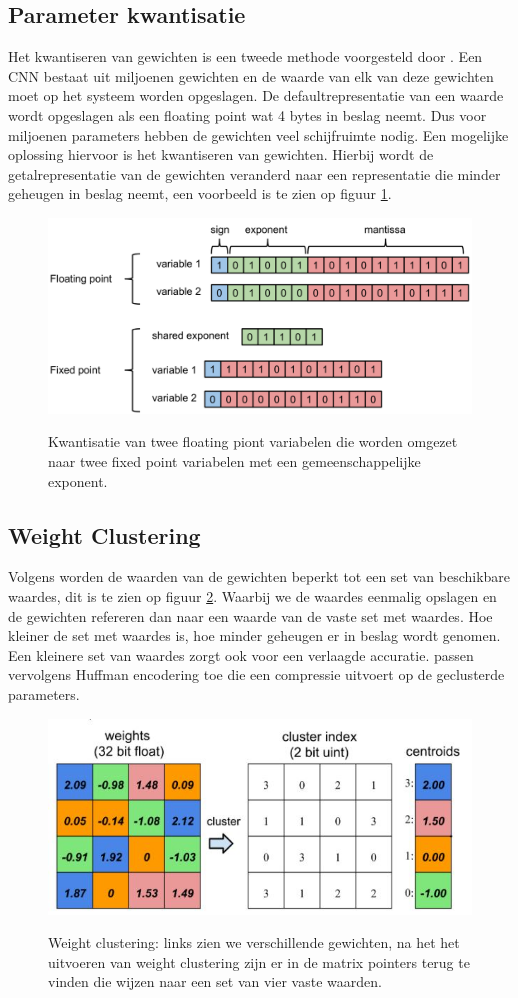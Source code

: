 \subsection{Parameter kwantisatie} \label{quant}
Het kwantiseren van gewichten is een tweede methode voorgesteld door \cite{han_deep_2016}.
Een CNN bestaat uit miljoenen gewichten en de waarde van elk van deze gewichten moet op het systeem worden opgeslagen.
De defaultrepresentatie van een waarde wordt opgeslagen als een floating point wat 4 bytes in beslag neemt.
Dus voor miljoenen parameters hebben de gewichten veel schijfruimte nodig.
Een mogelijke oplossing hiervoor is het kwantiseren van gewichten.
Hierbij wordt de getalrepresentatie van de gewichten veranderd naar een representatie die minder geheugen in beslag neemt, een voorbeeld is te zien op figuur \ref{fig:kwantizatie}.

\begin{figure}[!ht]
	\centering
	\includegraphics[width=0.65\linewidth]{fig/kwantization.png}
	\caption{Kwantisatie van twee floating piont variabelen die worden omgezet naar twee fixed point variabelen met een gemeenschappelijke exponent.}
	\label{fig:kwantizatie}
	\cite{liu2018artificial}
\end{figure}

\subsection{Weight Clustering}
Volgens \cite{han_deep_2016} worden de waarden van de gewichten beperkt tot een set van beschikbare waardes, dit is te zien op figuur \ref{fig:clus}.
Waarbij we de waardes eenmalig opslagen en de gewichten refereren dan naar een waarde van de vaste set met waardes.
Hoe kleiner de set met waardes is, hoe minder geheugen er in beslag wordt genomen.
Een kleinere set van waardes zorgt ook voor een verlaagde accuratie.
\cite{han_deep_2016} passen vervolgens Huffman encodering toe die een compressie uitvoert op de geclusterde parameters.

\begin{figure}[!ht]
	\centering
	\includegraphics[width=0.65\linewidth]{fig/clus.jpg}
	\caption{Weight clustering: links zien we verschillende gewichten, na het het uitvoeren van weight clustering zijn er in de matrix pointers terug te vinden die wijzen naar een set van vier vaste waarden.}
	\label{fig:clus}
	\cite{han_deep_2016}
\end{figure}

